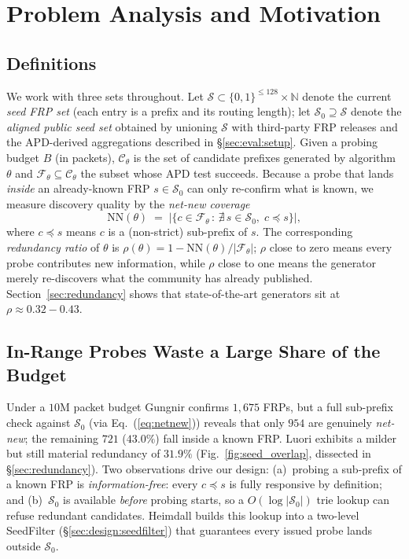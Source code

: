 \documentclass[conference]{IEEEtran}
\begin{document}
\section{Problem Analysis and Motivation}\label{sec:motivation}

\subsection{Definitions}
\label{sec:motivation:def}
We work with three sets throughout.  Let
$\mathcal{S}\subset\{0,1\}^{\le128}\times\mathbb{N}$ denote the
current \emph{seed FRP set} (each entry is a prefix and its
routing length); let $\mathcal{S}_{0}\supseteq\mathcal{S}$
denote the \emph{aligned public seed set} obtained by unioning
$\mathcal{S}$ with third-party FRP releases and the APD-derived
aggregations described in \S\ref{sec:eval:setup}.  Given a
probing budget $B$ (in packets), $\mathcal{C}_\theta$ is the set
of candidate prefixes generated by algorithm $\theta$ and
$\mathcal{F}_\theta\!\subseteq\!\mathcal{C}_\theta$ the subset
whose APD test succeeds.  Because a probe that lands
\emph{inside} an already-known FRP $s\!\in\!\mathcal{S}_{0}$ can
only re-confirm what is known, we measure discovery quality by
the \emph{net-new coverage}
\begin{equation}
\mathrm{NN}(\theta) \;=\;
\big|\{c\in\mathcal{F}_\theta \,:\, \nexists\,s\in\mathcal{S}_{0},\;
   c\preceq s\}\big|,
\label{eq:netnew}
\end{equation}
where $c\preceq s$ means $c$ is a (non-strict) sub-prefix of $s$.
The corresponding \emph{redundancy ratio} of $\theta$ is
$\rho(\theta)\!=\!1-\mathrm{NN}(\theta)/|\mathcal{F}_\theta|$;
$\rho$ close to zero means every probe contributes new
information, while $\rho$ close to one means the generator merely
re-discovers what the community has already published.
Section~\ref{sec:redundancy} shows that state-of-the-art
generators sit at $\rho\!\approx\!0.32\!-\!0.43$.

\subsection{In-Range Probes Waste a Large Share of the Budget}
Under a $10$M packet budget Gungnir confirms $1{,}675$ FRPs, but a
full sub-prefix check against $\mathcal{S}_{0}$ (via
Eq.~(\ref{eq:netnew})) reveals that only $954$ are genuinely
\emph{net-new}; the remaining $721$ ($43.0\%$) fall inside a known
FRP.  Luori exhibits a milder but still material redundancy of
$31.9\%$ (Fig.~\ref{fig:seed_overlap}, dissected in
\S\ref{sec:redundancy}).  Two observations drive our design:
(a)~probing a sub-prefix of a known FRP is
\emph{information-free}: every $c\preceq s$ is fully responsive by
definition; and (b)~$\mathcal{S}_{0}$ is available \emph{before}
probing starts, so a $O(\log|\mathcal{S}_{0}|)$ trie lookup can
refuse redundant candidates.  Heimdall builds this lookup into a
two-level SeedFilter (\S\ref{sec:design:seedfilter}) that guarantees
every issued probe lands outside $\mathcal{S}_{0}$.
\end{document}
